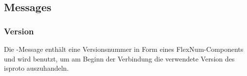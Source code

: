 %
%	
%	
%	
%

\subsection{Messages}

\subsubsection{Version}
\label{dcl-isproto-version}
Die \isprotoversion-Message enthält eine Versionsnummer in Form eines FlexNum-Components und wird
benutzt, um am Beginn der Verbindung die verwendete Version des \gls{isproto} auszuhandeln.

